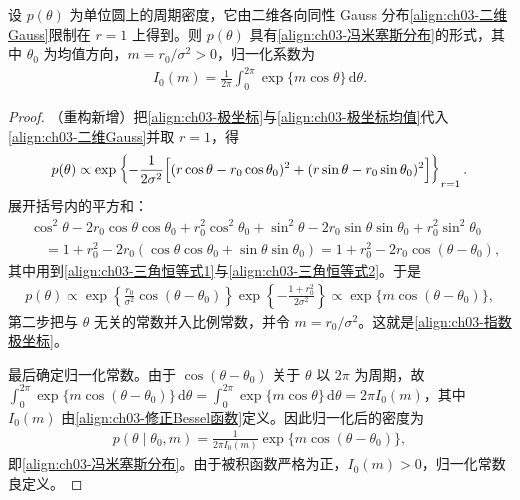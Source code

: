 \documentclass[../../main.tex]{subfiles}
\begin{document}
\begin{theorem}\label{theorem:ch03-冯米塞斯分布}
设 $p(\theta)$ 为单位圆上的周期密度，它由二维各向同性 Gauss 分布\eqref{align:ch03-二维Gauss}限制在 $r=1$ 上得到。则 $p(\theta)$ 具有\eqref{align:ch03-冯米塞斯分布}的形式，其中 $\theta_0$ 为均值方向，$m=r_0/\sigma^{2}>0$，归一化系数为
\begin{align}
I_0(m)=\frac{1}{2\pi}\int_{0}^{2\pi}\exp\{m\cos\theta\}\,\mathrm{d}\theta.
\label{align:ch03-修正Bessel函数}
\end{align}
\end{theorem}
\begin{proof}
（重构新增）把\eqref{align:ch03-极坐标}与\eqref{align:ch03-极坐标均值}代入\eqref{align:ch03-二维Gauss}并取 $r=1$，得
\begin{align*}
p(\theta)\propto\exp\left\{-\frac{1}{2\sigma^{2}}\Bigl[(r\cos\theta-r_0\cos\theta_0)^{2}+(r\sin\theta-r_0\sin\theta_0)^{2}\Bigr]\right\}_{r=1}.
\end{align*}
展开括号内的平方和：
\begin{align*}
&\cos^{2}\theta-2r_0\cos\theta\cos\theta_0+r_0^{2}\cos^{2}\theta_0+\sin^{2}\theta-2r_0\sin\theta\sin\theta_0+r_0^{2}\sin^{2}\theta_0\\
&\quad=1+r_0^{2}-2r_0(\cos\theta\cos\theta_0+\sin\theta\sin\theta_0)=1+r_0^{2}-2r_0\cos(\theta-\theta_0),
\end{align*}
其中用到\eqref{align:ch03-三角恒等式1}与\eqref{align:ch03-三角恒等式2}。于是
\begin{align*}
p(\theta)\propto\exp\left\{\frac{r_0}{\sigma^{2}}\cos(\theta-\theta_0)\right\}\exp\left\{-\frac{1+r_0^{2}}{2\sigma^{2}}\right\}\propto\exp\{m\cos(\theta-\theta_0)\},
\end{align*}
第二步把与 $\theta$ 无关的常数并入比例常数，并令 $m=r_0/\sigma^{2}$。这就是\eqref{align:ch03-指数极坐标}。

最后确定归一化常数。由于 $\cos(\theta-\theta_0)$ 关于 $\theta$ 以 $2\pi$ 为周期，故 $\int_0^{2\pi}\exp\{m\cos(\theta-\theta_0)\}\,\mathrm{d}\theta=\int_0^{2\pi}\exp\{m\cos\theta\}\,\mathrm{d}\theta=2\pi I_0(m)$，其中 $I_0(m)$ 由\eqref{align:ch03-修正Bessel函数}定义。因此归一化后的密度为
\begin{align*}
p(\theta\mid\theta_0,m)=\frac{1}{2\pi I_0(m)}\exp\{m\cos(\theta-\theta_0)\},
\end{align*}
即\eqref{align:ch03-冯米塞斯分布}。由于被积函数严格为正，$I_0(m)>0$，归一化常数良定义。
\end{proof}
\end{document}
